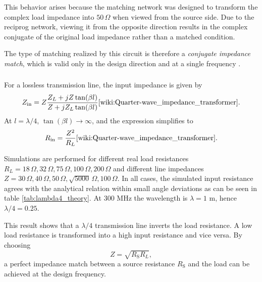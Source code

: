 \documentclass[a4paper,12pt]{article}
\begin{document}
	This behavior arises because the matching network was designed to transform the complex load
	impedance into $50\,\Omega$ when viewed from the source side. Due to the reciprog network, viewing it from the opposite direction results in the complex conjugate of the
	original load impedance rather than a matched condition.
	
	The type of matching realized by this circuit is therefore a \emph{conjugate impedance match},
	which is valid only in the design direction and at a single frequency \cite{schau_resonanz_komplexe_anpassung_2018}.
	
	\subsubsection{}
	For a lossless transmission line, the input impedance is given by
	\[
	Z_{\mathrm{in}} = Z \frac{Z_L + j Z \tan(\beta l)}{Z + j Z_L \tan(\beta l)} \cite{wiki:Quarter-wave_impedance_transformer}. 
	\] 
	At $l=\lambda/4$, $\tan(\beta l) \rightarrow \infty$, and the expression simplifies to
	\[
	R_{\mathrm{in}} = \frac{Z^2}{R_L} \cite{wiki:Quarter-wave_impedance_transformer}.
	\]
	
	Simulations are performed for different real load resistances
	$R_L = 18\,\Omega, 32\,\Omega, 75\,\Omega, 100\,\Omega, 200\,\Omega$
	and different line impedances
	$Z = 30\,\Omega, 40\,\Omega, 50\,\Omega, \sqrt{5000}\,\Omega, 100\,\Omega$.
	In all cases, the simulated input resistance agrees with the analytical relation within small angle deviations as can be seen in table \ref{tab:lambda4_theory}. At 300 MHz the wavelength is $\lambda = 1$ m, hence $\lambda/4 = 0.25$.
	
	This result shows that a $\lambda/4$ transmission line inverts the load resistance. A low load
	resistance is transformed into a high input resistance and vice versa. By choosing
	\[
	Z = \sqrt{R_{\mathrm{S}} R_L},
	\]
	a perfect impedance match between a source resistance $R_{\mathrm{S}}$ and the load can be
	achieved at the design frequency.
	
\end{document}
